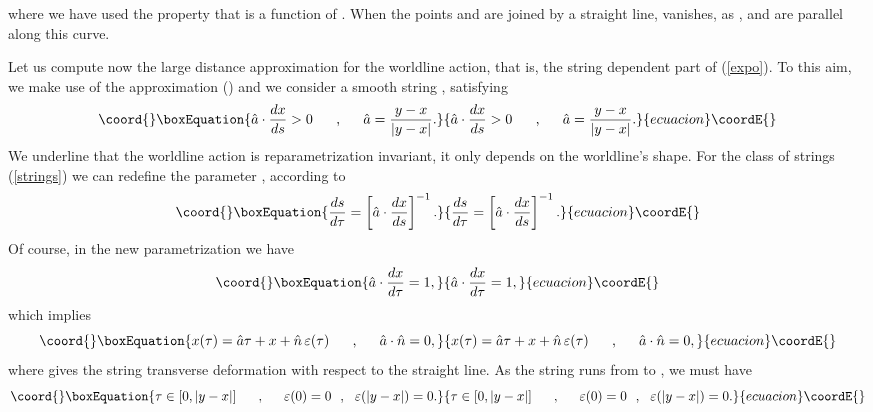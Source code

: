 \documentclass[a4paper,12pt]{article}
\begin{document}
where we have used the property that \coordHE{} is a function of \coordHE{}.
When the points \coordHE{} and \coordHE{} are joined by a straight line, \myHighlight{$\Omega_\gamma$}\coordHE{} vanishes, as \coordHE{}, \coordHE{} and \coordHE{} are parallel along this curve.

Let us compute now the large distance approximation for the worldline action, that is, the string dependent part of (\ref{expo}). To this aim, we make use of the approximation \coordHE{} (\coordHE{}) and we consider a smooth string \coordHE{}, satisfying
\begin{equation}\coord{}\boxEquation{
\hat{a}\cdot\frac{dx}{ds}>0 \makebox[.5in]{,} \hat{a}=\frac{y-x}{|y-x|}.
\label{strings}
}{
\hat{a}\cdot\frac{dx}{ds}>0 \makebox[.5in]{,} \hat{a}=\frac{y-x}{|y-x|}.
}{ecuacion}\coordE{}\end{equation}
We underline that the worldline action is reparametrization invariant, it only depends on the worldline's shape. For the class of strings (\ref{strings}) we can redefine the parameter \coordHE{}, according to
\begin{equation}\coord{}\boxEquation{
\frac{ds}{d\tau}=\left[ \hat{a} \cdot \frac{dx}{ds}\right]^{-1}.
}{
\frac{ds}{d\tau}=\left[ \hat{a} \cdot \frac{dx}{ds}\right]^{-1}.
}{ecuacion}\coordE{}\end{equation}
Of course, in the new parametrization we have
\begin{equation}\coord{}\boxEquation{
\hat{a} \cdot \frac{dx}{d\tau}=1,
}{
\hat{a} \cdot \frac{dx}{d\tau}=1,
}{ecuacion}\coordE{}\end{equation}
which implies
\begin{equation}\coord{}\boxEquation{
x(\tau)=\hat{a}\tau + x +\hat{n}\, \varepsilon(\tau)\makebox[.5in]{,} \hat{a} \cdot \hat{n}=0,
\label{param}
}{
x(\tau)=\hat{a}\tau + x +\hat{n}\, \varepsilon(\tau)\makebox[.5in]{,} \hat{a} \cdot \hat{n}=0,
}{ecuacion}\coordE{}\end{equation}
where \myHighlight{$\varepsilon$}\coordHE{} gives the string transverse deformation with respect to the straight line.
As the string runs from \coordHE{} to \coordHE{}, we must have
\begin{equation}\coord{}\boxEquation{
\tau \in [0, |y-x|]\makebox[.5in]{,} \varepsilon (0)=0~~,~~\varepsilon(|y-x|)=0.
\label{bcond}
}{
\tau \in [0, |y-x|]\makebox[.5in]{,} \varepsilon (0)=0~~,~~\varepsilon(|y-x|)=0.
}{ecuacion}\coordE{}\end{equation}
\end{document}
